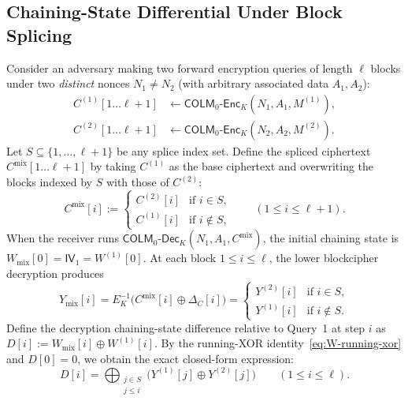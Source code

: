 \documentclass[11pt,a4paper]{article}
\theoremstyle{definition}
\theoremstyle{remark}
\newcommand{\IV}{\mathsf{IV}}
\begin{document}
\subsection{Chaining-State Differential Under Block Splicing}
Consider an adversary making two forward encryption queries of length $\ell$ blocks under two \emph{distinct} nonces $N_1 \neq N_2$ (with arbitrary associated data $A_1, A_2$):
\begin{equation}
\label{eq:two-queries}
\begin{aligned}
C^{(1)}[1 \dots \ell + 1] &\leftarrow \mathsf{COLM}_0\text{-}\mathsf{Enc}_K(N_1, A_1, M^{(1)}), \\
C^{(2)}[1 \dots \ell + 1] &\leftarrow \mathsf{COLM}_0\text{-}\mathsf{Enc}_K(N_2, A_2, M^{(2)}).
\end{aligned}
\end{equation}
Let $S \subseteq \{1, \dots, \ell + 1\}$ be any splice index set. Define the spliced ciphertext $C^{\mathrm{mix}}[1 \dots \ell + 1]$ by taking $C^{(1)}$ as the base ciphertext and overwriting the blocks indexed by $S$ with those of $C^{(2)}$:
\begin{equation}
\label{eq:c-mix}
C^{\mathrm{mix}}[i] := \begin{cases}
C^{(2)}[i] & \text{if } i \in S, \\
C^{(1)}[i] & \text{if } i \notin S,
\end{cases}
\qquad (1 \le i \le \ell + 1).
\end{equation}
When the receiver runs $\mathsf{COLM}_0\text{-}\mathsf{Dec}_K(N_1, A_1, C^{\mathrm{mix}})$, the initial chaining state is $W_{\mathrm{mix}}[0] = \IV_1 = W^{(1)}[0]$. At each block $1 \le i \le \ell$, the lower blockcipher decryption produces
\begin{equation}
\label{eq:Y-mix}
Y_{\mathrm{mix}}[i] = E_K^{-1}\big(C^{\mathrm{mix}}[i] \oplus \Delta_C[i]\big) = \begin{cases}
Y^{(2)}[i] & \text{if } i \in S, \\
Y^{(1)}[i] & \text{if } i \notin S.
\end{cases}
\end{equation}
Define the decryption chaining-state difference relative to Query~1 at step $i$ as $D[i] := W_{\mathrm{mix}}[i] \oplus W^{(1)}[i]$. By the running-XOR identity~\eqref{eq:W-running-xor} and $D[0] = 0$, we obtain the exact closed-form expression:
\begin{equation}
\label{eq:D-general}
D[i] = \bigoplus_{\substack{j \in S \\ j \le i}} \big(Y^{(1)}[j] \oplus Y^{(2)}[j]\big) \qquad (1 \le i \le \ell).
\end{equation}
\end{document}
